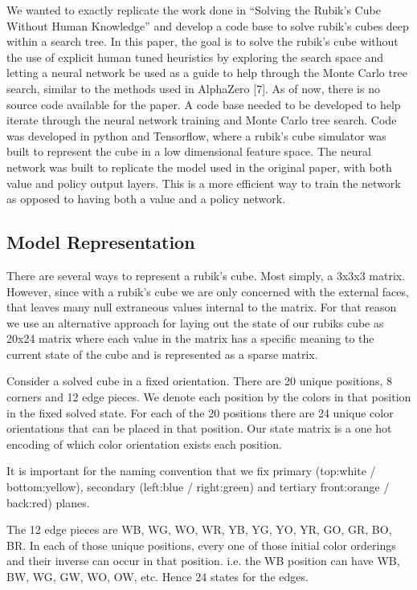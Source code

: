 \documentclass[10pt,twocolumn,letterpaper]{article}
\begin{document}
We wanted to exactly replicate the work done in “Solving the Rubik’s Cube Without Human Knowledge” and develop a code base to solve rubik's cubes deep within a search tree. In this paper, the goal is to solve the rubik's cube without the use of explicit human tuned heuristics by exploring the search space and letting a neural network be used as a guide to help through the Monte Carlo tree search, similar to the methods used in AlphaZero [7]. As of now, there is no source code available for the paper. A code base needed to be developed to help iterate through the neural network training and Monte Carlo tree search. Code was developed in python and Tensorflow, where a rubik's cube simulator was built to represent the cube in a low dimensional feature space. The neural network was built to replicate the model used in the original paper, with both value and policy output layers. This is a more efficient way to train the network as opposed to having both a value and a policy network.

\subsection{Model Representation}
There are several ways to represent a rubik's cube.  Most simply, a 3x3x3 matrix.  However, since with a rubik's cube we are only concerned with the external faces, that leaves many null extraneous values internal to the matrix.   For that reason we use an alternative approach for laying out the state of our rubiks cube as 20x24 matrix where each value in the matrix has a specific meaning to the current state of the cube and is represented as a sparse matrix.

Consider a solved cube in a fixed orientation.  There are 20 unique positions, 8 corners and 12 edge pieces.  We denote each position by the colors in that position in the fixed solved state.  For each of the 20 positions there are 24 unique color orientations that can be placed in that position.  Our state matrix is a one hot encoding of which color orientation exists each position. 

It is important for the naming convention that we fix primary (top:white / bottom:yellow), secondary (left:blue / right:green) and tertiary front:orange / back:red) planes.  

The 12 edge pieces are WB, WG, WO, WR, YB, YG, YO, YR, GO, GR, BO, BR.  In each of those unique positions, every one of those initial color orderings and their inverse can occur in that position.  i.e. the WB position can have WB, BW, WG, GW, WO, OW, etc.  Hence 24 states for the edges.  
\end{document}
